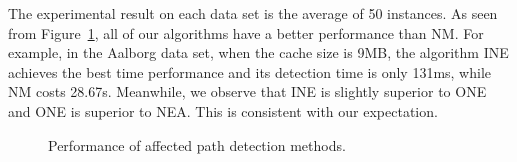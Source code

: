 The experimental result on each data set is the average of 50 instances.
As seen from Figure~\ref{fig:comparison-detecttime}, all of our algorithms have a better performance than NM.
For example, in the Aalborg data set, when the cache size is 9MB, the algorithm INE achieves the best time performance and its detection time is only 131ms, while NM costs 28.67s. Meanwhile, we observe that INE is slightly superior to ONE and ONE is superior to NEA. This is consistent with our expectation.
\begin{figure}[htbp]
\centering
 \caption{Performance of affected path detection methods.}
 \label{fig:comparison-detecttime}
\end{figure}


